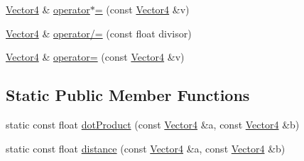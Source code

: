 \begin{DoxyCompactItemize}
\item 
\hyperlink{classprism_1_1geometry_1_1_vector4}{Vector4} \& \hyperlink{classprism_1_1geometry_1_1_vector4_ad5f2bc5c6f2480b8fb4da77dd8dcb04e}{operator$\ast$=} (const \hyperlink{classprism_1_1geometry_1_1_vector4}{Vector4} \&v)
\item 
\hyperlink{classprism_1_1geometry_1_1_vector4}{Vector4} \& \hyperlink{classprism_1_1geometry_1_1_vector4_ad31a96bf4f291b91a92971195785c0c4}{operator/=} (const float divisor)
\item 
\hyperlink{classprism_1_1geometry_1_1_vector4}{Vector4} \& \hyperlink{classprism_1_1geometry_1_1_vector4_aee2b3e83165a49a45290a450f805e106}{operator=} (const \hyperlink{classprism_1_1geometry_1_1_vector4}{Vector4} \&v)
\end{DoxyCompactItemize}
\subsection*{Static Public Member Functions}
\begin{DoxyCompactItemize}
\item 
static const float \hyperlink{classprism_1_1geometry_1_1_vector4_a76d4b88be3d861f43f0243d84e2f4965}{dot\+Product} (const \hyperlink{classprism_1_1geometry_1_1_vector4}{Vector4} \&a, const \hyperlink{classprism_1_1geometry_1_1_vector4}{Vector4} \&b)
\item 
static const float \hyperlink{classprism_1_1geometry_1_1_vector4_a3a8aae62c1b338884e46e71d09db6eae}{distance} (const \hyperlink{classprism_1_1geometry_1_1_vector4}{Vector4} \&a, const \hyperlink{classprism_1_1geometry_1_1_vector4}{Vector4} \&b)
\end{DoxyCompactItemize}
